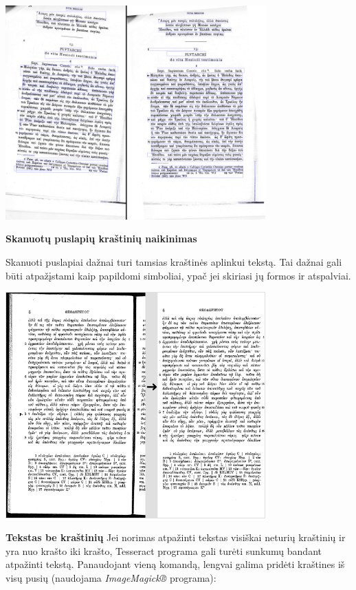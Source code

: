 \documentclass{VUMIFInfBakalaurinis}
\begin{document}
\begin{minipage}{\linewidth}
  \centering
  \includegraphics[width=10cm]{skew-linedetection.png}
  \label{skew-linedetection}
\end{minipage}


\textbf{Skanuotų puslapių kraštinių naikinimas}

Skanuoti puslapiai dažnai turi tamsias kraštinės aplinkui tekstą. 
Tai dažnai gali būti atpažįstami kaip papildomi simboliai, ypač jei skiriasi jų formos ir atspalviai.

\begin{minipage}{\linewidth}
  \centering
  \includegraphics[width=10cm]{borders.png}
  \label{borders}
\end{minipage}

\textbf{Tekstas be kraštinių}
Jei norimas atpažinti tekstas visiškai neturių kraštinių ir yra nuo krašto iki krašto, Tesseract programa gali turėti sunkumų bandant atpažinti tekstą.
Panaudojant vieną komandą, lengvai galima pridėti kraštines iš visų pusių (naudojama \textit{ImageMagick®} programa):
\end{document}
